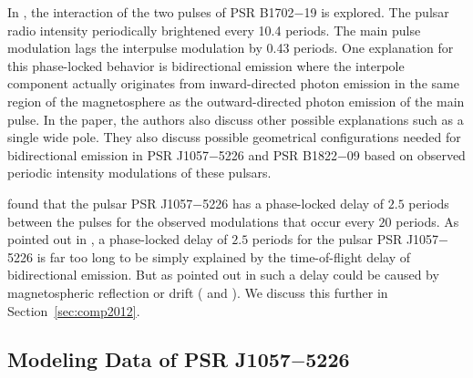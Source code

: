In \cite{weltevrede2007main}, the interaction of the two pulses of PSR B1702$-$19 is explored.  The pulsar radio intensity 
periodically brightened every 10.4 periods.  The main pulse modulation lags the interpulse modulation
by 0.43 periods.  One explanation for this phase-locked behavior is bidirectional emission where the
interpole component actually originates from inward-directed photon emission in the same region of the magnetosphere as the
outward-directed photon emission of the main pulse.  In the paper, the authors also discuss other possible explanations
such as a single wide pole.  They also discuss possible geometrical configurations needed for
bidirectional emission in PSR J1057$-$5226 and PSR B1822$-$09 based on observed
periodic intensity modulations of these pulsars.  

\cite{weltevrede2012interpole} found that the pulsar PSR J1057$-$5226 has 
a phase-locked
delay of $2.5$ periods between the pulses for the observed modulations
that occur every $20$ periods.
As pointed out in \cite{weltevrede2012interpole}, a phase-locked
delay of $2.5$ periods for the pulsar PSR J1057$-$5226 is far too long to be simply explained by the time-of-flight
delay of bidirectional emission.  But as pointed out in \cite{weltevrede2012phase}
such a delay could be caused by magnetospheric reflection or drift
(\citealp{wright2003empirical} and \citealp{melrose2012obliquely}).
We discuss this further in Section~\ref{sec:comp2012}.

\subsection{Modeling Data of PSR J1057$-$5226}
\label{sec:fitting}

